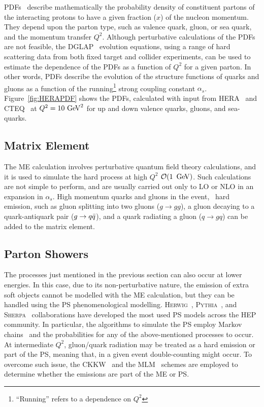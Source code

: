 			\acp{PDF}~\cite{Campbell2007} describe mathematically the probability density of constituent partons of the interacting protons to have a given fraction ($x$) of the nucleon momentum. They depend upon the parton type, such as valence quark, gluon, or sea quark, and the momentum transfer $Q^2$. Although perturbative calculations of the \acp{PDF} are not feasible, the \textsc{DGLAP}~\cite{Gribov:1972ri, Altarelli:1977zs} evolution equations, using a range of hard scattering data from both fixed target and collider experiments, can be used to estimate the dependence of the \acp{PDF} as a function of $Q^2$ for a given parton. In other words, \acp{PDF} describe the evolution of the structure functions of quarks and gluons as a function of the running\footnote{``Running'' refers to a dependence on $Q^2$} strong coupling constant $\alpha_s$. Figure~\ref{fig:HERAPDF} shows the \acp{PDF}, calculated with input from \textsc{HERA}~\cite{Aaron:2009aa} and \textsc{CTEQ}~\cite{Botts:1992yi} at $Q^2 = 10 \GeV^2$ for up and down valence quarks, gluons, and sea-quarks.



		\subsection*{Matrix Element}

			The \ac{ME} calculation involves perturbative quantum field theory calculations, and it is used to simulate the hard process at high $Q^2$ $\mathcal{O}(1\, \GeV)$. 
			Such calculations are not simple to perform, and are usually carried out only to \ac{LO} or \ac{NLO} in an expansion in $\alpha_s$. High momentum quarks and gluons in the event, \ie\ hard emission, such as gluon splitting into two gluons ($g\to gg$), a gluon decaying to a quark-antiquark pair ($g \rightarrow q\bar{q}$), and a quark radiating a gluon ($q \to gq$) can be added to the matrix element.

		\subsection*{Parton Showers}

			The processes just mentioned in the previous section can also occur at lower energies. In this case, due to its non-perturbative nature, the emission of extra soft objects cannot be modelled with the \ac{ME} calculation, but they can be handled using the \ac{PS} phenomenological modelling. \textsc{Herwig}~\cite{Herwig2001}, \textsc{Pythia}~\cite{Pythia2006}, and \textsc{Sherpa}~\cite{Sherpa} collaborations have developed the most used \ac{PS} models across the \ac{HEP} community. In particular, the algorithms to simulate the \ac{PS} employ Markov chains~\cite{Berg2004} and the probabilities for any of the above-mentioned processes to occur. At intermediate $Q^2$, gluon/quark radiation may be treated as a hard emission or part of the \ac{PS}, meaning that, in a given event double-counting might occur. To overcome such issue, the \ac{CKKW}~\cite{QCD2001} and the \ac{MLM}~\cite{ME2001} schemes are employed to determine whether the emissions are part of the \ac{ME} or \ac{PS}. 


